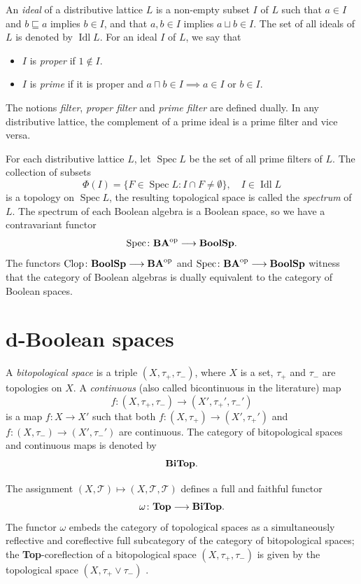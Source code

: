 \documentclass[11pt]{article}
\DeclareMathOperator{\idl}{Idl}
\DeclareMathOperator{\Spec}{Spec}
\DeclareMathOperator{\Clop}{Clop}
\theoremstyle{plain}
\theoremstyle{definition}
\newcommand{\CT}{\mathcal{T}}
\newcommand{\lra}{\longrightarrow}
\begin{document}
An \emph{ideal} of a distributive lattice $L$ is a non-empty subset $I$ of $L$ such that $a\in I$ and $b\sqsubseteq a$ implies $b\in I$, and that $a,b\in I$ implies $a\sqcup b\in I$. The set of all ideals of $L$ is denoted by $\idl L$.  For an ideal $I$ of $L$, we say that \begin{itemize} \setlength{\itemsep}{0pt} \item $I$ is \emph{proper} if $1\notin I$. \item  $I$ is \emph{prime} if it is proper and  $a\sqcap b\in I\implies a\in I$ or $ b\in I$. \end{itemize}

The notions \emph{filter}, \emph{proper filter} and \emph{prime filter} are defined dually. In any distributive lattice, the complement of a prime ideal is a prime filter and vice versa.

For each distributive lattice $L$, let $\Spec L$ be the set of all prime filters of $L$. The collection  of subsets $$\Phi(I)=\{F\in\Spec L: I\cap F\not=\emptyset\},\quad I\in\idl L $$ is a topology on $\Spec L$, the resulting topological space is called the  \emph{spectrum}  of $L$. The spectrum of each Boolean algebra is a Boolean space, so we have a  contravariant functor  $$\Spec\colon{\bf BA}^{\rm op}\longrightarrow{\bf BoolSp}.$$ The functors $\Clop\colon{\bf BoolSp}\longrightarrow{\bf BA}^{\rm op}$ and $\Spec\colon{\bf BA}^{\rm op}\longrightarrow{\bf BoolSp}$ witness that the category  of Boolean algebras is dually equivalent to the category of Boolean spaces.   

\section{d-Boolean spaces} \label{Stone bitopological spaces}
A \emph{bitopological space} \cite{Kelly} is a triple $(X,\tau_+,\tau_-)$, where $X$ is a set, $\tau_+$ and $\tau_-$ are topologies on $X$. A  \emph{continuous}  (also called bicontinuous in the literature) map
$$f\colon (X,\tau_+,\tau_-) \longrightarrow (X',\tau_+',\tau_-')$$ is a map $f\colon X\longrightarrow X'$ such that both $f\colon (X,\tau_+)\longrightarrow (X',\tau_+')$ and $f\colon (X,\tau_-)\longrightarrow (X',\tau_-')$ are continuous. The category of bitopological spaces and continuous maps is denoted by  $${\bf BiTop}.$$ 

The assignment $(X,\CT)\mapsto (X,\CT,\CT)$ defines a full and faithful functor $$\omega\colon {\bf Top}\lra{\bf BiTop}.$$ The functor $\omega$ embeds the category of topological spaces as a simultaneously reflective and coreflective full subcategory of the category of bitopological spaces; the {\bf Top}-coreflection of a bitopological space $(X,\tau_+, \tau_-)$ is given by the topological space $(X,\tau_+\vee\tau_-)$ \cite{HZ2025}.  
\end{document}
